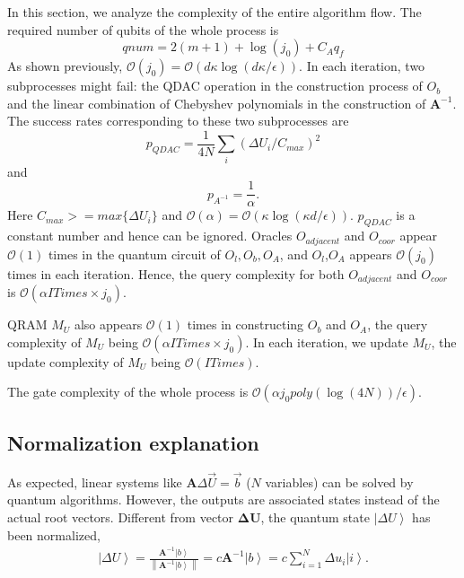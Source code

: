 \documentclass[%
 reprint,
 amsmath,amssymb,
pra,
]{revtex4-1}
\begin{document}
In this section, we analyze the complexity of the entire algorithm flow. The required number of qubits of the whole process is 
\begin{equation}
qnum=2(m+1)+\log(j_0)+C_Aq_f
\end{equation}
As shown previously, $\mathcal{O}(j_0)=\mathcal{O}(d\kappa\log(d\kappa/\epsilon))$. In each iteration, two subprocesses might fail: the QDAC operation in the construction process of $O_b$ and the linear combination of Chebyshev polynomials in the construction of $\bm{A}^{-1}$. The success rates corresponding to these two subprocesses are
\begin{equation}
p_{QDAC}=\frac{1}{4N}\sum_i{(\Delta U_i/C_{max})^2}
\end{equation}
and
\begin{equation}
p_{A^{-1}}=\frac{1}{\alpha}.
\end{equation}
Here $C_{max}>=max\{\Delta U_i\}$ and $\mathcal{O}(\alpha)=\mathcal{O}(\kappa\log(\kappa d/\epsilon))$. $p_{QDAC}$ is a constant number and hence can be ignored. Oracles $O_{adjacent}$ and $O_{coor}$ appear $\mathcal{O}(1)$ times in the quantum circuit of $O_l,O_b,O_A$, and $O_l$,$O_A$ appears $\mathcal{O}(j_0)$ times in each iteration. Hence, the query complexity for both $O_{adjacent}$ and $O_{coor}$ is $\mathcal{O}(\alpha ITimes\times j_0)$.

QRAM $M_U$ also appears $\mathcal{O}(1)$ times in constructing $O_b$ and $O_A$, the query complexity of $M_U$ being $\mathcal{O}(\alpha ITimes\times j_0)$. In each iteration, we update $M_U$, the update complexity of $M_U$ being $\mathcal{O}(ITimes)$.

The gate complexity of the whole process is $\mathcal{O}(\alpha j_0poly(\log(4N))/\epsilon)$.


\subsection{Normalization explanation}
As expected, linear systems like $\bm{A} \Delta \vec{U} = \vec{b}$ ($N$ variables) can be solved by quantum algorithms. However, the outputs are associated states instead of the actual root vectors. Different from vector $\bm{\Delta U}$, the quantum state $\left| \Delta U\right\rangle$ has been normalized,
\begin{align}
\left|\Delta U\right\rangle=\frac{\bm{A}^{-1}\left|b\right\rangle}{\left\|\bm{A}^{-1}\left|b\right\rangle\right\|}
= c \bm{A}^{-1} \left|b\right\rangle = c \sum_{i=1}^{N} \Delta u_i\left|i\right\rangle.
\end{align}
\end{document}
